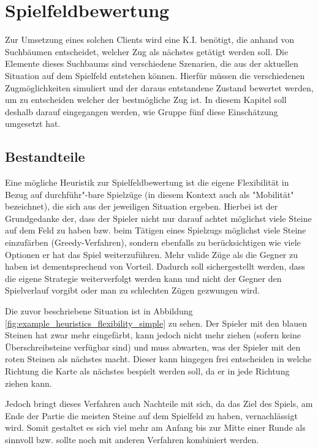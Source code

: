 \documentclass[12pt,a4paper,bibliography=totocnumbered,listof=totocnumbered]{article}
\begin{document}
\newpage
\section{Spielfeldbewertung}
Zur Umsetzung eines solchen Clients wird eine K.I. benötigt, die anhand von Suchbäumen entscheidet, welcher Zug als nächstes getätigt werden soll. Die Elemente dieses Suchbaums sind verschiedene Szenarien, die aus der aktuellen Situation auf dem Spielfeld entstehen können. Hierfür müssen die verschiedenen Zugmöglichkeiten simuliert und der daraus entstandene Zustand bewertet werden, um zu entscheiden welcher der bestmögliche Zug ist. 
In diesem Kapitel soll deshalb darauf eingegangen werden, wie Gruppe fünf diese Einschätzung umgesetzt hat.

\subsection{Bestandteile}\label{kap:Heuristik_Beschreibung}
Eine mögliche Heuristik zur Spielfeldbewertung ist die eigene Flexibilität in Bezug auf durchführ"-bare Spielzüge (in diesem Kontext auch als "Mobilität" bezeichnet), die sich aus der jeweiligen Situation ergeben. Hierbei ist der Grundgedanke der, dass der Spieler nicht nur darauf achtet möglichst viele Steine auf dem Feld zu haben bzw. beim Tätigen eines Spielzugs möglichst viele Steine einzufärben (Greedy-Verfahren), sondern ebenfalls zu berücksichtigen wie viele Optionen er hat das Spiel weiterzuführen. Mehr valide Züge als die Gegner zu haben ist dementsprechend von Vorteil. Dadurch soll sichergestellt werden, dass die eigene Strategie weiterverfolgt werden kann und nicht der Gegner den Spielverlauf vorgibt oder man zu \glqq schlechten\grqq{} Zügen gezwungen wird.

Die zuvor beschriebene Situation ist in Abbildung \ref{fig:example_heuristics_flexibility_simple} zu sehen. Der Spieler mit den blauen Steinen hat zwar mehr eingefärbt, kann jedoch nicht mehr ziehen (sofern keine Überschreibsteine verfügbar sind) und muss abwarten, was der Spieler mit den roten Steinen als nächstes macht. Dieser kann hingegen frei entscheiden in welche Richtung die Karte als nächstes bespielt werden soll, da er in jede Richtung ziehen kann.

Jedoch bringt dieses Verfahren auch Nachteile mit sich, da das Ziel des Spiels, am Ende der Partie die meisten Steine auf dem Spielfeld zu haben, vernachlässigt wird. Somit gestaltet es sich viel mehr am Anfang bis zur Mitte einer Runde als sinnvoll bzw. sollte noch mit anderen Verfahren kombiniert werden.
\end{document}
